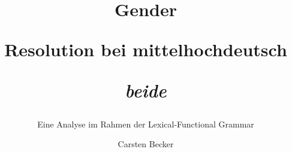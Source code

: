 \author{Carsten Becker}
\title{Gender\strut{} Resolution bei mittelhochdeutsch\strut{} \emph{beide}}
\subtitle{Eine Analyse im Rahmen der Lexical-Functional Grammar}
\renewcommand{\lsSeries}{ahl}
\renewcommand{\lsSeriesNumber}{1}%
\lsCoverTitleSizes{42pt}{14mm}%


